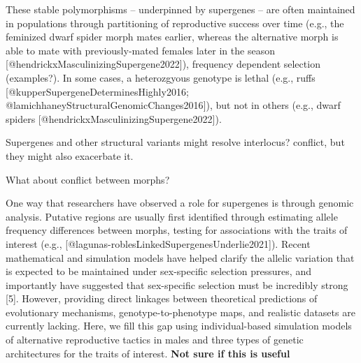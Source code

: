 \documentclass[
  11pt,
]{article}
\begin{document}
These stable polymorphisms -- underpinned by supergenes -- are
often maintained in populations through partitioning of reproductive
success over time (e.g., the feminized dwarf spider morph mates earlier,
whereas the alternative morph is able to mate with previously-mated
females later in the season {[}@hendrickxMasculinizingSupergene2022{]}),
frequency dependent selection (examples?). In some cases, a heterozgyous
genotype is lethal (e.g., ruffs {[}@kupperSupergeneDeterminesHighly2016;
@lamichhaneyStructuralGenomicChanges2016{]}), but not in others (e.g.,
dwarf spiders {[}@hendrickxMasculinizingSupergene2022{]}).

Supergenes and other structural variants might resolve interlocus? conflict, but they might also exacerbate it.

What about conflict between morphs?

One way that researchers have observed a role for supergenes is through genomic analysis. Putative regions are usually first identified through estimating allele frequency differences between morphs, testing for associations with the traits of interest (e.g., {[}@lagunas-roblesLinkedSupergenesUnderlie2021{]}). Recent mathematical and simulation models have helped clarify the allelic variation that is expected to be maintained
under sex-specific selection pressures,
and importantly have suggested that sex-specific selection must be incredibly strong
{[}5{]}.
However, providing direct linkages between theoretical predictions of
evolutionary mechanisms, genotype-to-phenotype maps, and realistic
datasets are currently lacking. Here, we fill this gap using
individual-based simulation models of alternative reproductive tactics
in males and three types of genetic architectures for the traits of
interest. \textbf{Not sure if this is useful}
\end{document}
